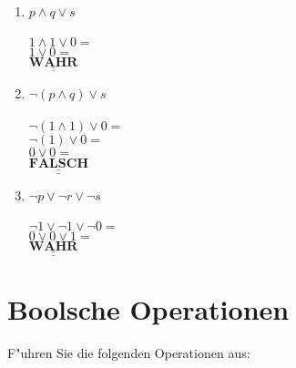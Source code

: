 \documentclass[a4paper,10pt]{article}
\def\doubleunderline#1{\underline{\underline{#1}}}
\begin{document}
\begin{enumerate}
\item $p \land q \lor s$ \\ \\
	 {\color{ForestGreen}
		 $1 \land 1 \lor 0 =$ \\
		 $1 \lor 0 = $ \\
		 $\mathbf{\doubleunderline{WAHR}}$ 
	 }
\item $\lnot (p \land q) \lor s$ \\ \\
	 {\color{ForestGreen}
		 $\lnot (1 \land 1) \lor 0 =$ \\
		 $\lnot (1) \lor 0 =$ \\
		 $0 \lor 0 =$ \\
		 $\mathbf{\doubleunderline{FALSCH}}$ 
	 }
\item $\lnot p \lor \lnot r \lor \lnot s$ \\ \\
	 {\color{ForestGreen}
		 $\lnot 1 \lor \lnot 1 \lor \lnot 0 =$ \\
		 $0 \lor 0 \lor 1 =$ \\
		 $\mathbf{\doubleunderline{WAHR}}$ 
	 }
\end{enumerate}

\section{Boolsche Operationen}
F"uhren Sie die folgenden Operationen aus:
\end{document}
